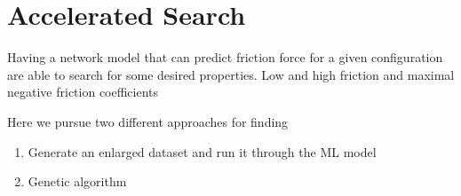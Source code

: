 \section{Accelerated Search}

Having a network model that can predict friction force for a given configuration
are able to search for some desired properties. Low and high friction and
maximal negative friction coefficients


Here we pursue two different approaches for finding 
\begin{enumerate}
  \item Generate an enlarged dataset and run it through the ML model 
  \item Genetic algorithm
\end{enumerate}





